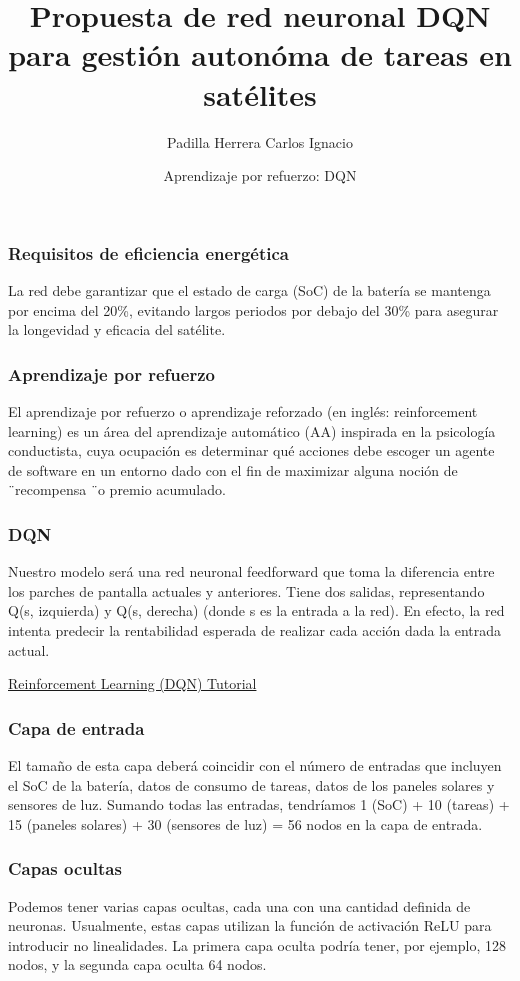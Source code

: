 \documentclass[10pt]{beamer}
\title[]
{
      \textbf{Propuesta de red neuronal DQN para gestión autonóma de tareas en satélites}
}
\subtitle[Propuesta de red neuronal DQN para
gestión autonóma de tareas en satélites]
{Padilla Herrera Carlos Ignacio}
\author[Padilla Herrera Carlos Ignacio]
{      Aprendizaje por refuerzo: DQN
}
\institute[]
{
      }
\date{}
\begin{document}
{\1%
\begin{frame}[plain,noframenumbering] %
  \titlepage %
\end{frame}}
\begin{frame}
  \frametitle{Requisitos de eficiencia energética}
  La red debe garantizar que el estado de carga (SoC) de la batería se mantenga por encima del 20\%, evitando largos periodos por debajo del 30\% para asegurar la longevidad y eficacia del satélite.
\end{frame}

\begin{frame}
  \frametitle{Aprendizaje por refuerzo}
  El aprendizaje por refuerzo o aprendizaje reforzado (en inglés: reinforcement learning) es un área del aprendizaje automático (AA) inspirada en la psicología conductista, cuya ocupación es determinar qué acciones debe escoger un agente de software en un entorno dado con el fin de maximizar alguna noción de \"\ recompensa \"\ o premio acumulado.
\end{frame}


\begin{frame}
  \frametitle{DQN}
  Nuestro modelo será una red neuronal feedforward que toma la diferencia entre los parches de pantalla actuales y anteriores. Tiene dos salidas, representando Q(s, izquierda) y Q(s, derecha) (donde s es la entrada a la red). En efecto, la red intenta predecir la rentabilidad esperada de realizar cada acción dada la entrada actual.
  
  \href{https://pytorch.org/tutorials/intermediate/reinforcement_q_learning.html}{Reinforcement Learning (DQN) Tutorial}
\end{frame}

\begin{frame}
  \frametitle{Capa de entrada}
   El tamaño de esta capa deberá coincidir con el número de entradas que incluyen el SoC de la batería, datos de consumo de tareas, datos de los paneles solares y sensores de luz.
Sumando todas las entradas, tendríamos 1 (SoC) + 10 (tareas) + 15 (paneles solares) + 30 (sensores de luz) = 56 nodos en la capa de entrada.

\end{frame}

\begin{frame}
  \frametitle{Capas ocultas}
  Podemos tener varias capas ocultas, cada una con una cantidad definida de neuronas. Usualmente, estas capas utilizan la función de activación ReLU para introducir no linealidades.
La primera capa oculta podría tener, por ejemplo, 128 nodos, y la segunda capa oculta 64 nodos.

\end{frame}
\end{document}
